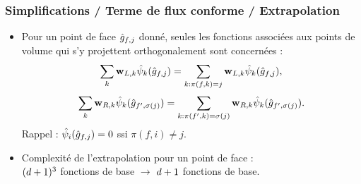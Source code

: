 \begin{frame}
\frametitle{Simplifications / Terme de flux conforme / Extrapolation}
\vfill
\begin{itemize}
\item Pour un point de face $\hat{g}_{f,j}$ donné, seules les fonctions associées aux points de volume qui s'y projettent orthogonalement sont concernées :
\begin{align*}
	\sum_{k} \bm{\mathrm{w}}_{L,k} \hat{\psi}_{k}(\hat{g}_{f,j})
		= \sum_{k:\pi(f,k)=j} \bm{\mathrm{w}}_{L,k} \hat{\psi}_{k}(\hat{g}_{f,j}) ,
\end{align*}
\begin{align*}
	\sum_{k} \bm{\mathrm{w}}_{R,k} \hat{\psi}_{k}(\hat{g}_{f',\sigma(j)})
		= \sum_{k:\pi(f',k)=\sigma(j)} \bm{\mathrm{w}}_{R,k} \hat{\psi}_{k}(\hat{g}_{f',\sigma(j)}) .
\end{align*}
Rappel : $\hat{\psi}_{i}(\hat{g}_{f,j}) = 0$ ssi $\pi(f,i) \ne j$.
\vfill
\item Complexité de l'extrapolation pour un point de face :\\
$(d + 1)^3$ fonctions de base $\rightarrow$ $d + 1$ fonctions de base.
\end{itemize}
\vfill
\end{frame}

